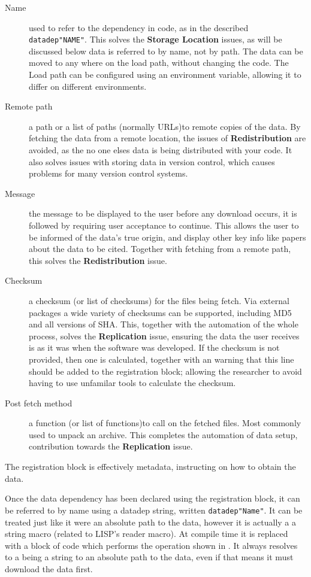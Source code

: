 \documentclass[twoside,11pt]{article}\usepackage{jmlr2e}
\newcommand{\datadep}[1]{\texttt{datadep"{}#1"{}}}
\begin{document}
\begin{description}
	\item[Name] used to refer to the dependency in code, as in the described \datadep{NAME}. 
	This solves the \textbf{Storage Location} issues, as will be discussed below data is referred to by name, not by path. The data can be moved to any where on the load path, without changing the code. The Load path can be configured using an environment variable, allowing it to differ on different environments.
	\item[Remote path] a path or a list of paths (normally URLs)to remote copies of the data. By fetching the data from a remote location, the issues of \textbf{Redistribution} are avoided, as the no one elses data is being distributed with your code. It also solves issues with storing data in version control, which causes problems for many version control systems.
	\item[Message] the message to be displayed to the user before any download occurs, it is followed by requiring user acceptance to continue. This allows the user to be informed of the data's true origin, and display other key info like papers about the data to be cited. Together with fetching from a remote path, this solves the \textbf{Redistribution} issue.
	\item[Checksum] a checksum (or list of checksums) for the files being fetch. Via external packages a wide variety of checksums can be supported, including MD5 and all versions of SHA.
	This, together with the automation of the whole process, solves the \textbf{Replication} issue, 
	ensuring the data the user receives is as it was when the software was developed.
	If the checksum is not provided, then one is calculated, together with an warning that this line should be added to the registration block; allowing the researcher to avoid having to use unfamilar tools to calculate the checksum.
	\item[Post fetch method] a function  (or list of functions)to call on the fetched files. Most commonly used to unpack an archive. This completes the automation of data setup, contribution towards the \textbf{Replication} issue.
\end{description}
\noindent The registration block is effectively metadata, instructing on how to obtain the data.

Once the data dependency has been declared using the registration block, it can be referred to by name using a datadep string, written \datadep{Name}.
It can be treated just like it were an absolute path to the data, however it is actually a a string macro (related to LISP's reader macro).
At compile time it is replaced with a block of code which performs the operation shown in .
It always resolves to a being a string to an absolute path to the data, even if that means it must download the data first.
\end{document}
